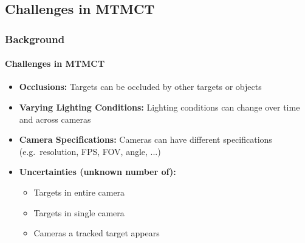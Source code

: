 \subsection{Challenges in MTMCT}
\begin{frame}
    \frametitle{Background}
    \framesubtitle{Challenges in MTMCT}

    \begin{itemize}
        \item <1->\textbf{Occlusions:} Targets can be occluded by other targets or objects
              \vspace{5pt}
        \item <2->\textbf{Varying Lighting Conditions:} Lighting conditions can change over time and across cameras
              \vspace{5pt}
        \item <3->\textbf{Camera Specifications:} Cameras can have different specifications (e.g.~resolution, FPS, FOV, angle, ...)
              \vspace{5pt}
        \item <4->\textbf{Uncertainties (unknown number of):}
              \begin{itemize}
                  \item Targets in entire camera
                  \item Targets in single camera
                  \item Cameras a tracked target appears
              \end{itemize}
    \end{itemize}
\end{frame}

